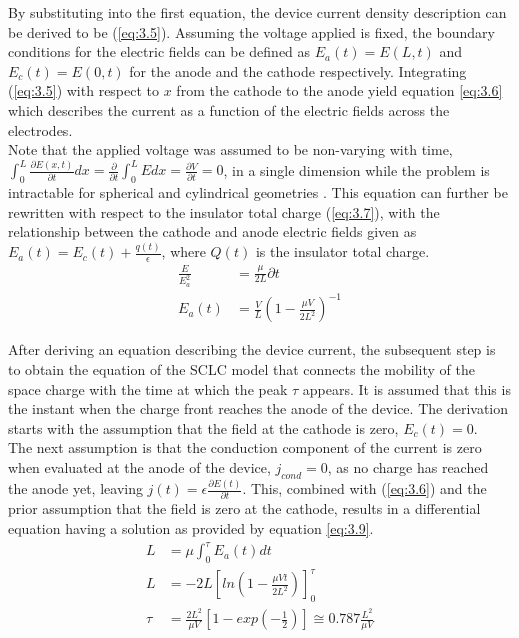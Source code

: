\noindent By substituting into the first equation, the device current density description can be derived to be (\ref{eq:3.5}). Assuming the voltage applied is fixed, the boundary conditions for the electric fields can be defined as $E_a(t) = E(L,t)$ and $E_c(t) = E(0,t)$ for the anode and the cathode respectively. Integrating (\ref{eq:3.5}) with respect to $x$ from the cathode to the anode yield equation \ref{eq:3.6} which describes the current as a function of the electric fields across the electrodes. \\

\noindent Note that the applied voltage was assumed to be non-varying with time, $\int_{0}^{L} \frac{\partial E(x,t)}{\partial t} dx = \frac{\partial }{\partial t} \int_{0}^{L}Edx = \frac{\partial V}{\partial t} = 0$, in a single dimension while the problem is intractable for spherical and cylindrical geometries \cite{lampert1970current}. This equation can further be rewritten with respect to the insulator total charge (\ref{eq:3.7}), with the relationship between the cathode and anode electric fields given as $E_a(t) = E_c(t) + \frac{q(t)}{\epsilon}$, where $Q(t)$ is the insulator total charge.
\begin{align}
\frac{E}{E_a^2} &= \frac{\mu}{2L} \partial t \label{eq:3.8} \\
E_a(t) &= \frac{V}{L}\left( 1 - \frac{\mu V}{2L^2} \right)^{-1} \label{eq:3.9}
\end{align}

\noindent After deriving an equation describing the device current, the subsequent step is to obtain the equation of the SCLC model that connects the mobility of the space charge with the time at which the peak $\tau$ appears. It is assumed that this is the instant when the charge front reaches the anode of the device. The derivation starts with the assumption that the field at the cathode is zero, $E_c(t) = 0$. \\

\noindent The next assumption is that the conduction component of the current is zero when evaluated at the anode of the device, $j_{cond} = 0$, as no charge has reached the anode yet, leaving $j(t)=\epsilon  \frac{\partial E(t)}{\partial t}$. This, combined with (\ref{eq:3.6}) and the prior assumption that the field is zero at the cathode, results in a differential equation having a solution as provided by equation \ref{eq:3.9}. 
\begin{align}
L &= \mu \int_{0}^{\tau} E_a(t) dt \label{eq:3.10} \\
L &= -2L \left[ ln \left( 1 - \frac{\mu V t}{2L^2} \right) \right]_0^{\tau} \label{eq:3.11} \\
\tau &= \frac{2 L^2}{\mu V} \left[ 1 - exp \left( -\frac{1}{2} \right) \right] \cong 0.787 \frac{L^2}{\mu V} \label{eq:3.12} 
\end{align}

